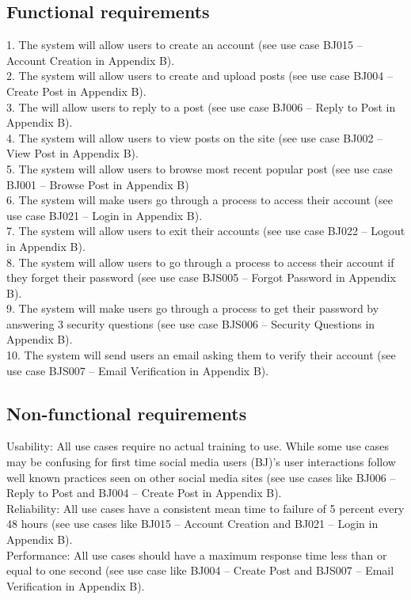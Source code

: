 \documentclass{report}
\begin{document}
	\subsection{Functional requirements}
	1.	The system will allow users to create an account (see use case BJ015 – Account Creation in Appendix B).\\
	2.	The system will allow users to create and upload posts (see use case BJ004 – Create Post in Appendix B).\\
	3.	The will allow users to reply to a post (see use case BJ006 – Reply to Post in Appendix B).\\
	4.	The system will allow users to view posts on the site (see use case BJ002 – View Post in Appendix B).\\
	5.	The system will allow users to browse most recent popular post (see use case BJ001 – Browse Post in Appendix B)\\
	6.	The system will make users go through a process to access their account (see use case BJ021 – Login in Appendix B).\\
	7.	The system will allow users to exit their accounts (see use case BJ022 – Logout in Appendix B).\\
	8.	The system will allow users to go through a process to access their account if they forget their password (see use case BJS005 – Forgot Password in Appendix B).\\
	9.	The system will make users go through a process to get their password by answering 3 security questions (see use case BJS006 – Security Questions in Appendix B).\\
	10.	The system will send users an email asking them to verify their account (see use case BJS007 – Email Verification in Appendix B).\\
	\subsection{Non-functional requirements}
		Usability: All use cases require no actual training to use. While some use cases may be confusing for first time social media users (BJ)’s user interactions follow well known practices seen on other social media sites (see use cases like BJ006 – Reply to Post and BJ004 – Create Post in Appendix B).\\
	Reliability: All use cases have a consistent mean time to failure of 5 percent every 48 hours (see use cases like BJ015 – Account Creation and BJ021 – Login in Appendix B).\\	
	Performance: All use cases should have a maximum response time less than or equal to one second (see use case like BJ004 – Create Post and BJS007 – Email Verification in Appendix B).\\
\end{document}
